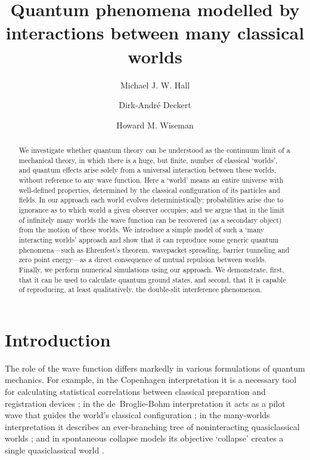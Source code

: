 \documentclass[12pt, aps,pra,amsmath,amssymb,superscriptaddress]{revtex4-2}
\renewcommand{\(}{\left(}
\renewcommand{\)}{\right)}
\newcommand{\blk}{\color{black}}
\begin{document}
\title{Quantum phenomena modelled by interactions between many classical worlds}  
\author{Michael J. W. Hall} 
\author{Dirk-Andr\'e Deckert}
\author{Howard M. Wiseman}


\begin{abstract}
    We investigate whether quantum theory can be understood as the continuum
    limit of a mechanical  theory, in which there is a huge, but finite, number
    of classical `worlds', and quantum effects arise solely from a universal
    interaction between these \blk 
    worlds, without reference to any wave function.  Here a `world' means an
    entire universe with well-defined properties, determined by the classical
    configuration of its  particles and fields.  
    In  our approach each world evolves deterministically; probabilities arise
    due to ignorance as to which world a given observer occupies;  and we argue
    that in the limit of infinitely many worlds the wave function can be
    recovered (as a secondary object) \blk from the motion of these worlds.  We 
    introduce a simple model of such \blk a `many interacting worlds' approach 
    and show \blk that it can reproduce some
    generic quantum phenomena---such as Ehrenfest's theorem, wavepacket
    spreading, barrier tunneling and zero point energy---as a direct consequence
    of mutual repulsion between worlds. 
    Finally,  we perform numerical simulations using our approach. We demonstrate, first,
    that it can be used to calculate \blk 
    quantum ground states, \blk and second,
    that it is capable of  reproducing, at least qualitatively, the double-slit \blk interference phenomenon. \blk
\end{abstract}


\maketitle
\newpage

\section{Introduction}

The role of the wave function differs markedly in various formulations of
quantum mechanics.  For example, in the Copenhagen  interpretation it is a
necessary tool for calculating statistical correlations between \blk {\em a
priori} \blk classical preparation and registration devices \cite{copenhagen};
in the de~Broglie-Bohm interpretation it acts as a pilot wave that guides the
\blk world's classical \blk configuration \cite{dbb}; in the
many-worlds interpretation it describes an ever-branching tree of noninteracting
\blk quasiclassical \blk worlds \cite{mwi}; and in spontaneous collapse models
its objective `collapse' \blk creates a single quasiclassical world \blk 
\cite{grw}.  
\end{document}
